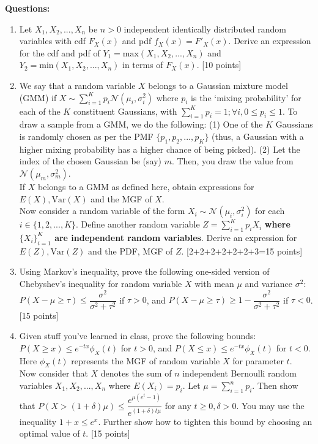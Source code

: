 \documentclass[11pt]{article}
\begin{document}
\textbf{Questions:}
\begin{enumerate}
\item Let $X_1, X_2, ..., X_n$ be $n > 0$ independent identically distributed random variables with cdf $F_X(x)$ and pdf $f_X(x) = F'_X(x)$. Derive an expression for the cdf and pdf of $Y_1 = \textrm{max}(X_1, X_2, ..., X_n)$ and $Y_2 = \textrm{min}(X_1, X_2, ..., X_n)$ in terms of $F_X(x)$. \textsf{[10 points]}

\item We say that a random variable $X$ belongs to a Gaussian mixture model (GMM) if $X \sim \sum_{i=1}^K p_i \mathcal{N}(\mu_i,\sigma^2_i)$ where $p_i$ is the `mixing probability' for each of the $K$ constituent Gaussians, with $\sum_{i=1}^K p_i = 1; \forall i, 0 \leq p_i \leq 1$. To draw a sample from a GMM, we do the following: (1) One of the $K$ Gaussians is randomly chosen as per the PMF $\{p_1,p_2,...,p_K\}$ (thus, a Gaussian with a higher mixing probability has a higher chance of being picked). (2) Let the index of the chosen Gaussian be (say) $m$. Then, you draw the value from $\mathcal{N}(\mu_m,\sigma^2_m)$.  \\
If $X$ belongs to a GMM as defined here, obtain expressions for $E(X), \textrm{Var}(X)$ and the MGF of $X$. \\
Now consider a random variable of the form $X_i \sim \mathcal{N}(\mu_i,\sigma^2_i)$ for each $i \in \{1,2,...,K\}$. Define another random variable $Z = \sum_{i=1}^K p_i X_i$ \textbf{where $\{X_i\}_{i=1}^K$ are independent random variables}. Derive an expression for $E(Z), \textrm{Var}(Z)$ and the PDF, MGF of $Z$. \textsf{[2+2+2+2+2+2+3=15 points]} 

\item Using Markov's inequality, prove the following one-sided version of Chebyshev's inequality for random variable $X$ with mean $\mu$ and variance $\sigma^2$:
$P(X-\mu \geq \tau) \leq \dfrac{\sigma^2}{\sigma^2 + \tau^2}$ if $\tau > 0$, and $P(X-\mu \geq \tau) \geq 1-\dfrac{\sigma^2}{\sigma^2 + \tau^2}$ if $\tau < 0$. \textsf{[15 points]}

\item Given stuff you've learned in class, prove the following bounds: $P(X \geq x) \leq e^{-tx} \phi_X(t)$ for $t > 0$, and $P(X \leq x) \leq e^{-tx} \phi_X(t)$ for $t < 0$. Here $\phi_X(t)$ represents the MGF of random variable $X$ for parameter $t$. \\
Now consider that $X$ denotes the sum of $n$ independent Bernoulli random variables $X_1, X_2,...,X_n$ where $E(X_i) = p_i$. Let $\mu = \sum_{i=1}^n p_i$. Then show that $P(X > (1+\delta)\mu) \leq \dfrac{e^{\mu(e^t-1)}}{e^{(1+\delta)t\mu}}$ for any $t \geq 0, \delta > 0$. You may use the inequality $1+x \leq e^x$. Further show how to tighten this bound by choosing an optimal value of $t$.
\textsf{[15 points]}


\end{enumerate}
\end{document}
